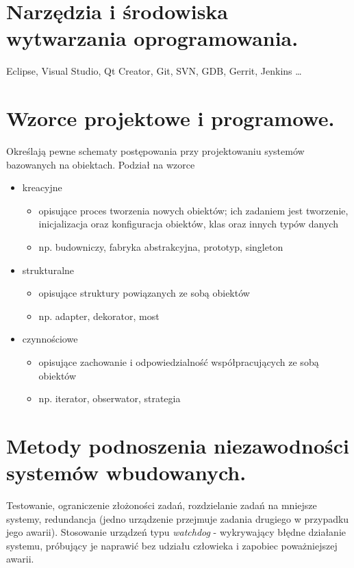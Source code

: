 \documentclass[12pt,a4paper]{article}
\begin{document}
	\section{Narzędzia i środowiska wytwarzania oprogramowania.}
	Eclipse, Visual Studio, Qt Creator, Git, SVN, GDB, Gerrit, Jenkins \dots

	\section{Wzorce projektowe i programowe.}
	Określają pewne schematy postępowania przy projektowaniu systemów bazowanych na obiektach. Podział na wzorce
	\begin{itemize}
		\item kreacyjne
			\begin{itemize}
				\item opisujące proces tworzenia nowych obiektów; ich zadaniem jest tworzenie, inicjalizacja oraz konfiguracja obiektów, klas oraz innych typów danych
				\item np. budowniczy, fabryka abstrakcyjna, prototyp, singleton
			\end{itemize}
		\item strukturalne
		\begin{itemize}
			\item opisujące struktury powiązanych ze sobą obiektów
			\item np. adapter, dekorator, most
		\end{itemize}
		\item czynnościowe
		\begin{itemize}
			\item opisujące zachowanie i odpowiedzialność współpracujących ze sobą obiektów
			\item np. iterator, obserwator, strategia
		\end{itemize}
	\end{itemize}

	\section{Metody podnoszenia niezawodności systemów wbudowanych.}
	Testowanie, ograniczenie złożoności zadań, rozdzielanie zadań na mniejsze systemy, redundancja (jedno urządzenie przejmuje zadania drugiego w przypadku jego awarii). Stosowanie urządzeń typu \textit{watchdog} - wykrywający błędne działanie systemu, próbujący je naprawić bez udziału człowieka i zapobiec poważniejszej awarii.
\end{document}
